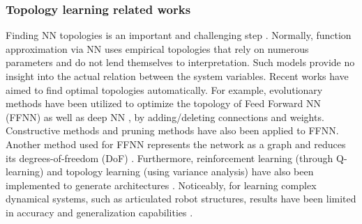 \subsubsection{Topology learning related works}
Finding NN topologies is an important and challenging step \cite{Tirumala2016Evolvingdeepneural,Rocha2005Simultaneousevolutionneural,Baker2017Designingneuralnetwork}. Normally, function approximation via NN uses empirical topologies that rely on numerous parameters and do not lend themselves to interpretation. Such models provide no insight into the actual relation between the system variables. Recent works have aimed to find optimal topologies automatically. For example, evolutionary methods have been utilized to optimize the topology of Feed Forward NN (FFNN) \cite{Rocha2005Simultaneousevolutionneural,Matteucci2006ELeaRNTEvolutionarylearning} as well as  deep NN \cite{Tirumala2016Evolvingdeepneural}, by adding/deleting connections and weights. Constructive methods \cite{Kwok1995Constructivefeedforwardneural} and pruning methods \cite{Srinivas2016LearningNeuralNetwork} have also been applied to FFNN. Another method used for FFNN represents the network as a graph and reduces its degrees-of-freedom (DoF) \cite{He2015Topologicaloptimisationartificial}. Furthermore, reinforcement learning (through Q-learning) and topology learning (using variance analysis) have also been implemented to generate architectures \cite{Baker2017Designingneuralnetwork,Castillo2007Functionalnetworktopology}. Noticeably, for learning complex dynamical systems, such as articulated robot structures, results have been limited in accuracy and generalization capabilities \cite{NguyenTuong2011Modellearningrobot,NguyenTuong2008Learninginversedynamics,NguyenTuong2010Usingmodelknowledge}. 

